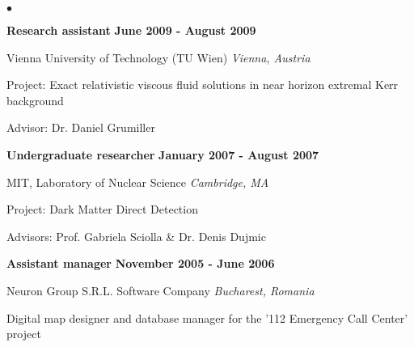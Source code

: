 \documentclass[margin,line]{res}
\newenvironment{list1}{
  \begin{list}{\ding{113}}{%
      \setlength{\itemsep}{0in}
      \setlength{\parsep}{0in} \setlength{\parskip}{0in}
      \setlength{\topsep}{0in} \setlength{\partopsep}{0in} 
      \setlength{\leftmargin}{0.17in}}}{\end{list}}
\newenvironment{list2}{
  \begin{list}{$\bullet$}{%
      \setlength{\itemsep}{0in}
      \setlength{\parsep}{0in} \setlength{\parskip}{0in}
      \setlength{\topsep}{0in} \setlength{\partopsep}{0in} 
      \setlength{\leftmargin}{0.2in}}}{\end{list}}
\begin{document}
\begin{resume}
\begin{list2}
\item[] {\bf Research assistant} \hfill {\bf June 2009 - August 2009}
\begin{list1}
\item[] Vienna University of Technology (TU Wien) \hfill \textit{Vienna, Austria}
\item[] Project: Exact relativistic viscous fluid solutions in near horizon extremal Kerr background
\item[] Advisor: Dr. Daniel Grumiller \\
\end{list1}

\item[] {\bf Undergraduate researcher} \hfill {\bf January 2007 - August 2007}
\begin{list1}
\item[] MIT, Laboratory of Nuclear Science \hfill \textit{Cambridge, MA}
\item[] Project: Dark Matter Direct Detection
\item[] Advisors: Prof. Gabriela Sciolla \& Dr. Denis Dujmic \\
\end{list1}

\item[] {\bf Assistant manager} \hfill {\bf November 2005 - June 2006}
\begin{list1}
\item[] Neuron Group S.R.L. Software Company \hfill \textit{Bucharest, Romania}
\item[] Digital map designer and database manager for the '112 Emergency Call Center' project
\end{list1}
\end{list2}


\end{resume}
\end{document}
